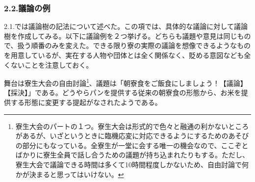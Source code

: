 \subsubsection*{2.2.議論の例}
2.1.では議論樹の記法について述べた。この項では、具体的な議論に対して議論樹を作成してみる。以下に議論例を２つ挙げる。どちらも議題や意見は同じもので、扱う順番のみを変えた。できる限り寮の実際の議論を想像できるようなものを用意しているが、実在する人物や団体とは全く関係なく、貶める意図なども全くないことを注意しておく。
\par
舞台は寮生大会の自由討論\footnote{寮生大会のパートの１つ。寮生大会は形式的で色々と融通の利かないところがあるが、いざというときに臨機応変に対応できるようにするためのあそびの部分にもなっている。全寮生が一堂に会する唯一の機会なので、ここぞとばかりに寮生全員で話し合うための議題が持ち込まれたりもする。ただし、寮生大会で議論できる時間は多くて10時間程度しかないため、自由討論で何かが決まると思ってはいけない。}、議題は「朝寮食をご飯食にしましょう！【議論】【採決】」である。どうやらパンを提供する従来の朝寮食の形態から、お米を提供する形態に変更する提起がなされたようである。

